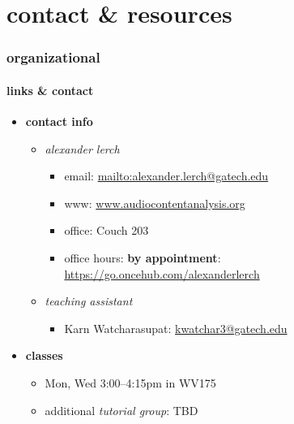 

\subtitle{Part 1: Organizational}


	

    \section[contact]{contact \& resources}
        \begin{frame}\frametitle{organizational}\framesubtitle{links \& contact}
            \begin{itemize}
                \item \textbf{contact info}
                    \begin{itemize}
                        \item   \textit{alexander lerch}
                            \begin{itemize}
                                \item   {email}: \url{mailto:alexander.lerch@gatech.edu}
                                \item   {www}: \url{www.audiocontentanalysis.org}
                                \item   {office}: Couch 203
                                \item   {office hours}:  \textbf{by appointment}: \url{https://go.oncehub.com/alexanderlerch}
                            \end{itemize}
                        \item   \textit{teaching assistant}
                            \begin{itemize}
                                \item    Karn Watcharasupat: \url{kwatchar3@gatech.edu}
                            \end{itemize}
                    \end{itemize}
                
                \smallskip
                \item<2-> \textbf{classes}
                    \begin{itemize}
                        \item   Mon, Wed  3:00--4:15pm in WV175
                        \item   additional \textit{tutorial group}: TBD
                    \end{itemize}
                

\end{itemize}
\end{frame}
